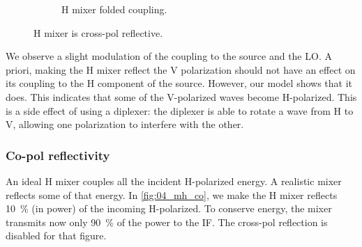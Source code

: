 \begin{figure}[hbtp]
\begin{subfigure}[b]{.5\textwidth}
        \caption{H mixer folded coupling.}
    \end{subfigure}%
    \caption{H mixer is cross-pol reflective.}
    \label{fig:03_mh_cr}
\end{figure}

We observe a slight modulation of the coupling to the source and the LO.
A priori, making the H mixer reflect the V polarization should not have an effect on its coupling to the H component of the source.
However, our model shows that it does.
This indicates that some of the V-polarized waves become H-polarized.
This is a side effect of using a diplexer: the diplexer is able to rotate a wave from H to V, allowing one polarization to interfere with the other.

\subsubsection{Co-pol reflectivity}
An ideal H mixer couples all the incident H-polarized energy.
A realistic mixer reflects some of that energy.
In \cref{fig:04_mh_co}, we make the H mixer reflects \SI{10}{\percent} (in power) of the incoming H-polarized.
To conserve energy, the mixer transmits now only \SI{90}{\percent} of the power to the IF.
The cross-pol reflection is disabled for that figure.

